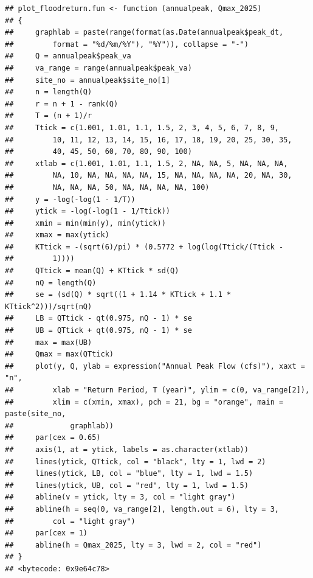 \documentclass{tufte-handout}\usepackage[]{graphicx}\usepackage[]{xcolor}
\makeatletter
\newenvironment{kframe}{%
 \def\at@end@of@kframe{}%
 \ifinner\ifhmode%
  \def\at@end@of@kframe{\end{minipage}}%
  \begin{minipage}{\columnwidth}%
 \fi\fi%
 \def\FrameCommand##1{\hskip\@totalleftmargin \hskip-\fboxsep
 \colorbox{shadecolor}{##1}\hskip-\fboxsep
     \hskip-\linewidth \hskip-\@totalleftmargin \hskip\columnwidth}%
 \MakeFramed {\advance\hsize-\width
   \@totalleftmargin\z@ \linewidth\hsize
   \@setminipage}}%
 {\par\unskip\endMakeFramed%
 \at@end@of@kframe}
\newenvironment{knitrout}{}{} %
\makeatother
\begin{document}
\begin{knitrout}
\color{fgcolor}\begin{kframe}
\begin{verbatim}
## plot_floodreturn.fun <- function (annualpeak, Qmax_2025) 
## {
##     graphlab = paste(range(format(as.Date(annualpeak$peak_dt, 
##         format = "%d/%m/%Y"), "%Y")), collapse = "-")
##     Q = annualpeak$peak_va
##     va_range = range(annualpeak$peak_va)
##     site_no = annualpeak$site_no[1]
##     n = length(Q)
##     r = n + 1 - rank(Q)
##     T = (n + 1)/r
##     Ttick = c(1.001, 1.01, 1.1, 1.5, 2, 3, 4, 5, 6, 7, 8, 9, 
##         10, 11, 12, 13, 14, 15, 16, 17, 18, 19, 20, 25, 30, 35, 
##         40, 45, 50, 60, 70, 80, 90, 100)
##     xtlab = c(1.001, 1.01, 1.1, 1.5, 2, NA, NA, 5, NA, NA, NA, 
##         NA, 10, NA, NA, NA, NA, 15, NA, NA, NA, NA, 20, NA, 30, 
##         NA, NA, NA, 50, NA, NA, NA, NA, 100)
##     y = -log(-log(1 - 1/T))
##     ytick = -log(-log(1 - 1/Ttick))
##     xmin = min(min(y), min(ytick))
##     xmax = max(ytick)
##     KTtick = -(sqrt(6)/pi) * (0.5772 + log(log(Ttick/(Ttick - 
##         1))))
##     QTtick = mean(Q) + KTtick * sd(Q)
##     nQ = length(Q)
##     se = (sd(Q) * sqrt((1 + 1.14 * KTtick + 1.1 * KTtick^2)))/sqrt(nQ)
##     LB = QTtick - qt(0.975, nQ - 1) * se
##     UB = QTtick + qt(0.975, nQ - 1) * se
##     max = max(UB)
##     Qmax = max(QTtick)
##     plot(y, Q, ylab = expression("Annual Peak Flow (cfs)"), xaxt = "n", 
##         xlab = "Return Period, T (year)", ylim = c(0, va_range[2]), 
##         xlim = c(xmin, xmax), pch = 21, bg = "orange", main = paste(site_no, 
##             graphlab))
##     par(cex = 0.65)
##     axis(1, at = ytick, labels = as.character(xtlab))
##     lines(ytick, QTtick, col = "black", lty = 1, lwd = 2)
##     lines(ytick, LB, col = "blue", lty = 1, lwd = 1.5)
##     lines(ytick, UB, col = "red", lty = 1, lwd = 1.5)
##     abline(v = ytick, lty = 3, col = "light gray")
##     abline(h = seq(0, va_range[2], length.out = 6), lty = 3, 
##         col = "light gray")
##     par(cex = 1)
##     abline(h = Qmax_2025, lty = 3, lwd = 2, col = "red")
## }
## <bytecode: 0x9e64c78>
\end{verbatim}
\end{kframe}
\end{knitrout}
\end{document}
